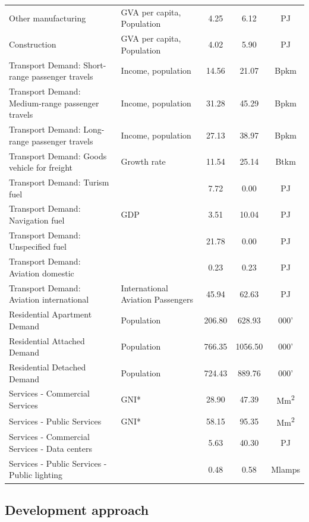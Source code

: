 \documentclass[gmd,manuscript]{copernicus}
\begin{document}
\begin{table}[htbp]
\begin{tabular}{llccc}
    Other manufacturing  & GVA per capita, Population & 4.25  & 6.12  & PJ \\
    Construction & GVA per capita, Population & 4.02  & 5.90  & PJ \\
    Transport Demand: Short-range passenger travels & Income, population & 14.56 & 21.07 & Bpkm \\
    Transport Demand: Medium-range passenger travels & Income, population & 31.28 & 45.29 & Bpkm \\
    Transport Demand: Long-range passenger travels & Income, population & 27.13 & 38.97 & Bpkm \\
    Transport Demand: Goods vehicle for freight & Growth rate \citep{AECOMIrelandLimited2019} & 11.54 & 25.14 & Btkm \\
    Transport Demand: Turism fuel  &       & 7.72  & 0.00  & PJ \\
    Transport Demand: Navigation fuel  & GDP   & 3.51  & 10.04 & PJ \\
    Transport Demand: Unspecified fuel &       & 21.78 & 0.00  & PJ \\
    Transport Demand: Aviation domestic &       & 0.23  & 0.23  & PJ \\
    Transport Demand: Aviation international & International Aviation Passengers & 45.94 & 62.63 & PJ \\
    Residential Apartment Demand & Population & 206.80 & 628.93 & 000' \\
    Residential Attached Demand & Population & 766.35 & 1056.50 & 000' \\
    Residential Detached Demand & Population & 724.43 & 889.76 & 000' \\
    Services - Commercial Services & GNI*  & 28.90 & 47.39 & Mm\textsuperscript{2} \\
    Services - Public Services & GNI*  & 58.15 & 95.35 & Mm\textsuperscript{2} \\
    Services - Commercial Services - Data centers & \citet{EirGridT57:online} & 5.63  & 40.30 & PJ \\
    Services - Public Services - Public lighting & \citet{GovernmentofIreland2018} & 0.48  & 0.58  & Mlamps \\ \hline
    \end{tabular}%
  \label{tab:ESD_list}%
\end{table}%


\subsection{Development approach}
\label{ss:model_dev}
\end{document}
